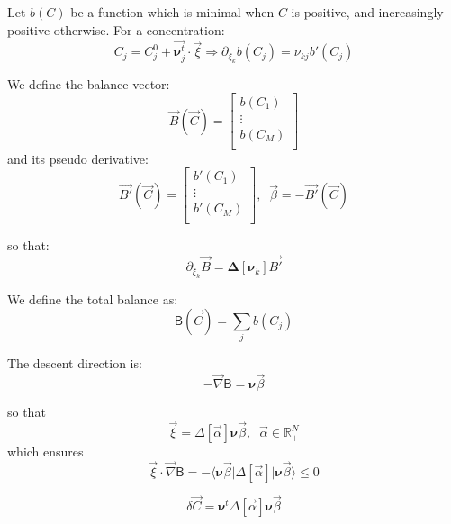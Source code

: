 \documentclass[aps,12pt]{revtex4}
\begin{document}
Let $b(C)$ be a function which is minimal when $C$ is positive, and increasingly positive otherwise.
For a concentration:
\begin{equation}
C_j = C_j^0 + \vec{\bm{\nu}^t_j} \cdot \vec{\xi} \Rightarrow \partial_{\xi_k} b(C_j) = \nu_{kj} b'(C_j)
\end{equation}

We define the balance vector:
\begin{equation}
\vec{B}(\vec{C}) = 
\begin{bmatrix}
	b(C_1) \\
	\vdots\\
	b(C_M)\\
\end{bmatrix}
\end{equation}
and its pseudo derivative:
\begin{equation}
\vec{B'}(\vec{C}) = 
\begin{bmatrix}
	b'(C_1) \\
	\vdots\\
	b'(C_M)\\
\end{bmatrix},
\;\;\vec{\beta} = - \vec{B'}(\vec{C})
\end{equation} 

so that:
\begin{equation}
	\partial_{\xi_k} \vec{B} = \bm{\Delta}[\bm{\nu}_k] \vec{B'}
\end{equation}

We define the total balance as:
\begin{equation}
	\mathsf{B}(\vec{C}) = \sum_j b(C_j)
\end{equation}

The descent direction is:
\begin{equation}
	-\vec{\nabla} \mathsf{B} = \bm{\nu} \vec{\beta}
\end{equation}

so that
\begin{equation}
	\vec{\xi}  =  \Delta[\vec{\alpha}] \bm{\nu} \vec{\beta},\;\;\vec{\alpha} \in \mathbb{R}_+^N
\end{equation}
which ensures
\begin{equation}
	\vec{\xi} \cdot \vec{\nabla} \mathsf{B} = - \langle \bm{\nu} \vec{\beta} \vert \Delta[\vec{\alpha}]  \vert \bm{\nu} \vec{\beta} \rangle \leq 0 
\end{equation}

\begin{equation}
	\delta\vec{C} = \bm{\nu}^t \Delta[\vec{\alpha}] \bm{\nu} \vec{\beta}
\end{equation}
\end{document}
